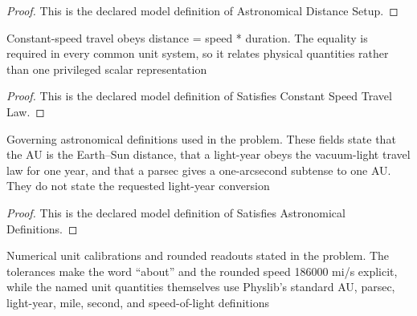 \begin{proof}
  This is the declared model definition of Astronomical Distance Setup.
\end{proof}
\begin{definition}
  \label{def:physics:phyx-mini-0727:phyxminiproblems-problemphyxmini0727-satisfiesconstantspeedtravellaw}
  Constant-speed travel obeys distance = speed * duration. The equality is required in every common unit system, so it relates physical quantities rather than one privileged scalar representation
\end{definition}
\begin{proof}
  This is the declared model definition of Satisfies Constant Speed Travel Law.
\end{proof}
\begin{definition}
  \label{def:physics:phyx-mini-0727:phyxminiproblems-problemphyxmini0727-satisfiesastronomicaldefinitions}
  Governing astronomical definitions used in the problem. These fields state that the AU is the Earth--Sun distance, that a light-year obeys the vacuum-light travel law for one year, and that a parsec gives a one-arcsecond subtense to one AU. They do not state the requested light-year conversion
\end{definition}
\begin{proof}
  This is the declared model definition of Satisfies Astronomical Definitions.
\end{proof}
\begin{definition}
  \label{def:physics:phyx-mini-0727:phyxminiproblems-problemphyxmini0727-matchesreportedastronomicaldata}
  Numerical unit calibrations and rounded readouts stated in the problem. The tolerances make the word “about” and the rounded speed 186000 mi/s explicit, while the named unit quantities themselves use Physlib's standard AU, parsec, light-year, mile, second, and speed-of-light definitions
\end{definition}
